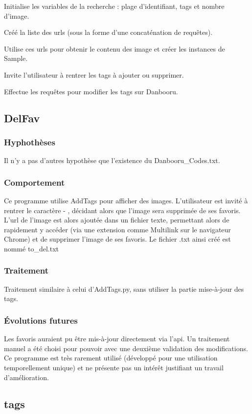 \documentclass[a4paper,12pt]{article}
\begin{document}
Initialise les variables de la recherche : plage d'identifiant, tags et nombre d'image.

Créé la liste des urls (sous la forme d'une concaténation de requêtes).

Utilise ces urls pour obtenir le contenu des image et créer les instances de Sample.

Invite l'utilisateur à rentrer les tags à ajouter ou supprimer.

Effectue les requêtes pour modifier les tags sur Danbooru.

\subsection{DelFav}
\subsubsection{Hyphothèses}
Il n'y a pas d'autres hypothèse que l'existence du Danbooru\_Codes.txt.
\subsubsection{Comportement}
Ce programme utilise AddTags pour afficher des images. L'utilisateur est invité à rentrer le caractère \og - \fg, décidant alors que l'image sera supprimée de ses favoris. L'url de l'image est alors ajoutée dans un fichier texte, permettant alors de rapidement y accéder (via une extension comme \og Multilink \fg{} sur le navigateur Chrome) et de supprimer l'image de ses favoris. Le fichier .txt ainsi créé est nommé \og to\_del.txt \fg{} 
\subsubsection{Traitement}
Traitement similaire à celui d'AddTags.py, sans utiliser la partie mise-à-jour des tags.
\subsubsection{Évolutions futures}
Les favoris auraient pu être mis-à-jour directement via l'api. Un traitement manuel a été choisi pour pouvoir avec une deuxième validation des modifications. Ce programme est très rarement utilisé (développé pour une utilisation temporellement unique) et ne présente pas un intérêt justifiant un travail d'amélioration.

\subsection{tags}
\end{document}
